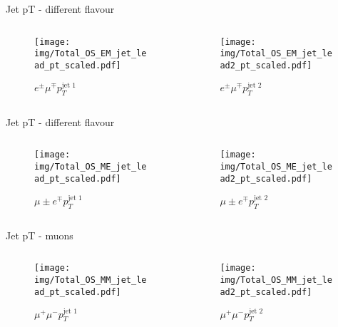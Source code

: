 \documentclass{beamer}
\begin{document}
\begin{frame}{Jet pT - different flavour}
  \begin{columns}
    \begin{column}{0.45\textwidth}\begin{figure}
      \caption{$e^{\pm}\mu^{\mp}$$p_{T}^{\text{jet 1}}$}
      \texttt{[image: img/Total\_OS\_EM\_jet\_lead\_pt\_scaled.pdf]}
    \end{figure}\end{column}
    \begin{column}{0.45\textwidth}\begin{figure}
      \caption{$e^{\pm}\mu^{\mp}$$p_{T}^{\text{jet 2}}$}
      \texttt{[image: img/Total\_OS\_EM\_jet\_lead2\_pt\_scaled.pdf]}
    \end{figure}\end{column}
  \end{columns}
\end{frame}

\begin{frame}{Jet pT - different flavour}
  \begin{columns}
    \begin{column}{0.45\textwidth}\begin{figure}
      \caption{$\mu{\pm}e^{\mp}$$p_{T}^{\text{jet 1}}$}
      \texttt{[image: img/Total\_OS\_ME\_jet\_lead\_pt\_scaled.pdf]}
    \end{figure}\end{column}
    \begin{column}{0.45\textwidth}\begin{figure}
      \caption{$\mu{\pm}e^{\mp}$$p_{T}^{\text{jet 2}}$}
      \texttt{[image: img/Total\_OS\_ME\_jet\_lead2\_pt\_scaled.pdf]}
    \end{figure}\end{column}
  \end{columns}
\end{frame}

\begin{frame}{Jet pT - muons}
  \begin{columns}
    \begin{column}{0.45\textwidth}\begin{figure}
      \caption{$\mu^{+}\mu^{-}$$p_{T}^{\text{jet 1}}$}
      \texttt{[image: img/Total\_OS\_MM\_jet\_lead\_pt\_scaled.pdf]}
    \end{figure}\end{column}
    \begin{column}{0.45\textwidth}\begin{figure}
      \caption{$\mu^{+}\mu^{-}$$p_{T}^{\text{jet 2}}$}
      \texttt{[image: img/Total\_OS\_MM\_jet\_lead2\_pt\_scaled.pdf]}
    \end{figure}\end{column}
  \end{columns}
\end{frame}
\end{document}
